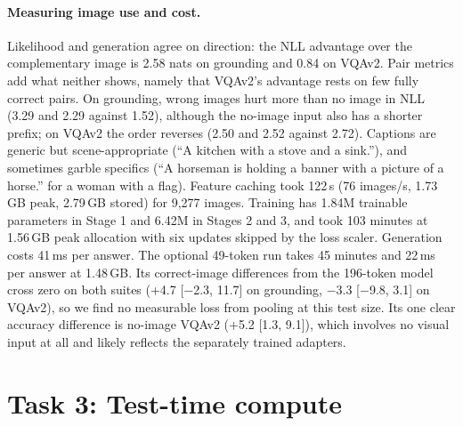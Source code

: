 \documentclass{article}
\begin{document}
\paragraph{Measuring image use and cost.} Likelihood and generation agree on direction: the NLL advantage over the complementary image is 2.58 nats on grounding and 0.84 on VQAv2. Pair metrics add what neither shows, namely that VQAv2's advantage rests on few fully correct pairs. On grounding, wrong images hurt more than no image in NLL (3.29 and 2.29 against 1.52), although the no-image input also has a shorter prefix; on VQAv2 the order reverses (2.50 and 2.52 against 2.72). Captions are generic but scene-appropriate (``A kitchen with a stove and a sink.''), and sometimes garble specifics (``A horseman is holding a banner with a picture of a horse.'' for a woman with a flag). Feature caching took 122\,s (76 images/s, 1.73\,GB peak, 2.79\,GB stored) for 9,277 images. Training has 1.84M trainable parameters in Stage 1 and 6.42M in Stages 2 and 3, and took 103 minutes at 1.56\,GB peak allocation with six updates skipped by the loss scaler. Generation costs 41\,ms per answer. The optional 49-token run takes 45 minutes and 22\,ms per answer at 1.48\,GB. Its correct-image differences from the 196-token model cross zero on both suites (+4.7 [$-$2.3, 11.7] on grounding, $-$3.3 [$-$9.8, 3.1] on VQAv2), so we find no measurable loss from pooling at this test size. Its one clear accuracy difference is no-image VQAv2 (+5.2 [1.3, 9.1]), which involves no visual input at all and likely reflects the separately trained adapters.

\section{Task 3: Test-time compute}
\end{document}
